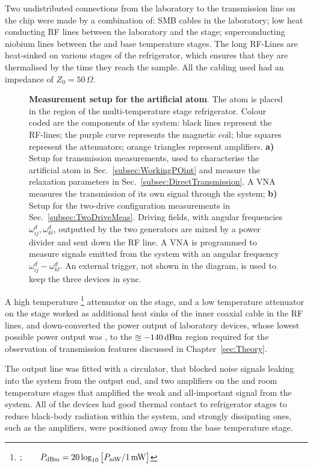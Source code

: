   Two undistributed connections from the laboratory to the transmission line on the chip were made by a combination of: SMB cables in the laboratory; low heat conducting RF lines between the laboratory and the  stage; superconducting niobium lines between the  and base temperature stages. The long RF-Lines are heat-sinked on various stages of the refrigerator, which ensures that they are thermalised by the time they reach the sample. All the cabling used had an impedance of $ Z_0=50\,\Omega $.
    
  \begin{figure}
  	\caption{\small\textbf{Measurement setup for the artificial atom}. The atom is placed in the  region of the multi-temperature stage refrigerator. Colour coded are the components of the system: black lines represent the RF-lines; the purple curve represents the magnetic coil; blue squares represent the attenuators; orange triangles represent amplifiers. \textbf{a)} Setup for transmission measurements, used to characterise the artificial atom in Sec.~\ref{subsec:WorkingPOint} and measure the relaxation parameters in Sec.~\ref{subsec:DirectTransmission}. A VNA measures the transmission of its own signal through the system; \textbf{b)} Setup for the two-drive configuration measurements in Sec.~\ref{subsec:TwoDriveMeas}. Driving fields, with angular frequencies $ \omega_{ij}^{d}, \omega_{kl}^{d} $, outputted by the two generators are mixed by a power divider and sent down the RF line. A VNA is programmed to measure signals emitted from the system with an angular frequency $  \omega_{ij}^{d} - \omega_{kl}^{d} $. An external trigger, not shown in the diagram, is used to keep the three devices in sync.}
  	\label{setupDiagrams}
  \end{figure}

  A high temperature \footnote{$;\qquad P_\text{dBm} = 20\log_{10}\big[P_\text{mW}/1\,\text{mW}\big]  $} attenuator on the  stage, and a low temperature  attenuator on the  stage worked as additional heat sinks of the inner coaxial cable in the RF lines, and down-converted the power output of laboratory devices, whose lowest possible power output was , to the $ \approxeq-140\,\text{dBm} $ region required for the observation of transmission features discussed in Chapter~\ref{sec:Theory}.
  
  The output line was fitted with a circulator, that blocked noise signals leaking into the system from the output end, and two  amplifiers on the  and room temperature stages that amplified the weak and all-important signal from the system. All of the devices had good thermal contact to refrigerator stages to reduce black-body radiation within the system, and strongly dissipating ones, such as the amplifiers, were positioned away from the base temperature stage.
   
